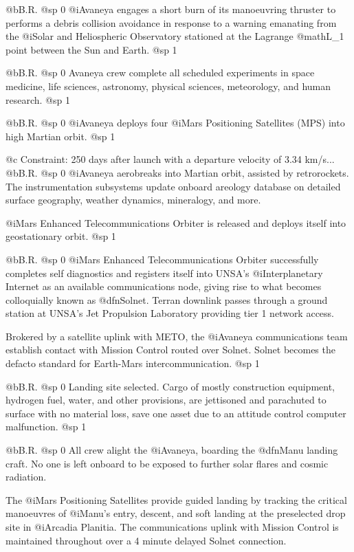 @b{B.R.}
@sp 0
@i{Avaneya} engages a short burn of its manoeuvring thruster to performs a debris collision avoidance in response to a warning emanating from the @i{Solar and Heliospheric Observatory} stationed at the Lagrange @math{L_1} point between the Sun and Earth.
@sp 1

@b{B.R.}
@sp 0
Avaneya crew complete all scheduled experiments in space medicine, life sciences, astronomy, physical sciences, meteorology, and human research.
@sp 1

@b{B.R.}
@sp 0
@i{Avaneya} deploys four @i{Mars Positioning Satellites} (MPS) into high Martian orbit.
@sp 1

@c Constraint: 250 days after launch with a departure velocity of 3.34 km/s...
@b{B.R.}
@sp 0
@i{Avaneya} aerobreaks into Martian orbit, assisted by retrorockets. The instrumentation subsystems update onboard areology database on detailed surface geography, weather dynamics, mineralogy, and more.

@i{Mars Enhanced Telecommunications Orbiter} is released and deploys itself into geostationary orbit.
@sp 1

@b{B.R.}
@sp 0
@i{Mars Enhanced Telecommunications Orbiter} successfully completes self diagnostics and registers itself into UNSA's @i{Interplanetary Internet} as an available communications node, giving rise to what becomes colloquially known as @dfn{Solnet}. Terran downlink passes through a ground station at UNSA's Jet Propulsion Laboratory providing tier 1 network access.

Brokered by a satellite uplink with METO, the @i{Avaneya} communications team establish contact with Mission Control routed over Solnet. Solnet becomes the defacto standard for Earth-Mars intercommunication.
@sp 1

@b{B.R.}
@sp 0
Landing site selected. Cargo of mostly construction equipment, hydrogen fuel, water, and other provisions, are jettisoned and parachuted to surface with no material loss, save one asset due to an attitude control computer malfunction.
@sp 1

@b{B.R.}
@sp 0
All crew alight the @i{Avaneya}, boarding the @dfn{Manu} landing craft. No one is left onboard to be exposed to further solar flares and cosmic radiation.

The @i{Mars Positioning Satellites} provide guided landing by tracking the critical manoeuvres of @i{Manu's} entry, descent, and soft landing at the preselected drop site in @i{Arcadia Planitia}. The communications uplink with Mission Control is maintained throughout over a 4 minute delayed Solnet connection.

